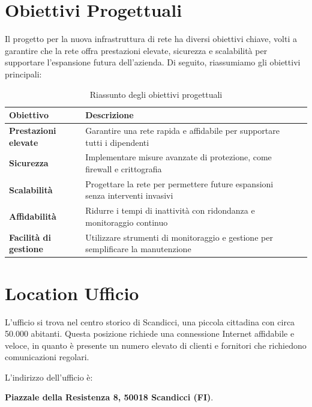 \documentclass{assignment}
\begin{document}
\section*{Obiettivi Progettuali}

Il progetto per la nuova infrastruttura di rete ha diversi obiettivi chiave, volti a garantire che la rete offra prestazioni elevate, sicurezza e scalabilità per supportare l'espansione futura dell'azienda. Di seguito, riassumiamo gli obiettivi principali:

\begin{table}[H]
\centering
\begin{tabular}{|>{\bfseries}m{4cm}|m{8cm}|m{5cm}|}    
    \toprule
    \rowcolor{lightblue} Obiettivo & Descrizione \\
    \midrule
    Prestazioni elevate & Garantire una rete rapida e affidabile per supportare tutti i dipendenti \\
    \midrule
    Sicurezza & Implementare misure avanzate di protezione, come firewall e crittografia \\
    \midrule
    Scalabilità & Progettare la rete per permettere future espansioni senza interventi invasivi \\
    \midrule
    Affidabilità & Ridurre i tempi di inattività con ridondanza e monitoraggio continuo \\
    \midrule
    Facilità di gestione & Utilizzare strumenti di monitoraggio e gestione per semplificare la manutenzione \\
    \bottomrule
\end{tabular}
\caption{Riassunto degli obiettivi progettuali}
\end{table}

\section{Location Ufficio}

L'ufficio si trova nel centro storico di Scandicci, una piccola cittadina con circa 50.000 abitanti. Questa posizione richiede una connessione Internet affidabile e veloce, in quanto è presente un numero elevato di clienti e fornitori che richiedono comunicazioni regolari.


L'indirizzo dell'ufficio è:

\begin{exercisebox}
    \begin{center}
        \textbf{Piazzale della Resistenza 8, 50018 Scandicci (FI)}.
    \end{center}
\end{exercisebox}
\end{document}
